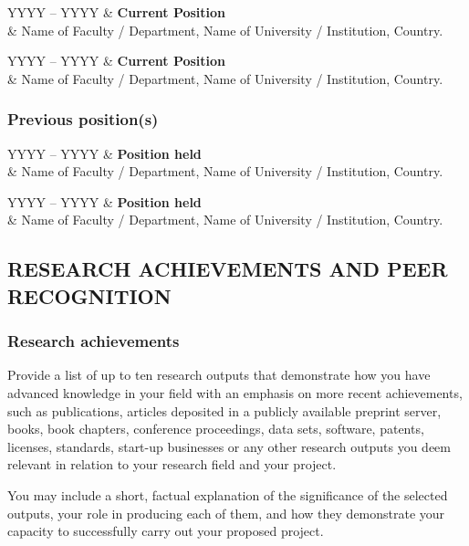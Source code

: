 \documentclass[timesnewroman,partone,draftproposal]{erc-stg}
\begin{document}
\begin{erccvitem}
YYYY -- YYYY & \textbf{Current Position} \\
& Name of Faculty / Department, Name of University / Institution, Country.
\end{erccvitem}
\medskip

\begin{erccvitem}
YYYY -- YYYY & \textbf{Current Position} \\
& Name of Faculty / Department, Name of University / Institution, Country.
\end{erccvitem}

\subsubsection*{Previous position(s)}

\begin{erccvitem}
YYYY -- YYYY & \textbf{Position held} \\
& Name of Faculty / Department, Name of University / Institution, Country.
\end{erccvitem}
\medskip

\begin{erccvitem}
YYYY -- YYYY & \textbf{Position held} \\
& Name of Faculty / Department, Name of University / Institution, Country.
\end{erccvitem}

\subsection*{RESEARCH ACHIEVEMENTS AND PEER RECOGNITION}
\label{ssc:cv:research}

\subsubsection*{Research achievements}

\begin{erccomment}
Provide a list of up to ten research outputs that demonstrate how you have
advanced knowledge in your field with an emphasis on more recent achievements,
such as publications, articles deposited in a publicly available preprint
server, books, book chapters, conference proceedings, data sets, software,
patents, licenses, standards, start-up businesses or any other research outputs
you deem relevant in relation to your research field and your project.

You may include a short, factual explanation of the significance of the
selected outputs, your role in producing each of them, and how they demonstrate
your capacity to successfully carry out your proposed project.
\end{erccomment}
\end{document}
